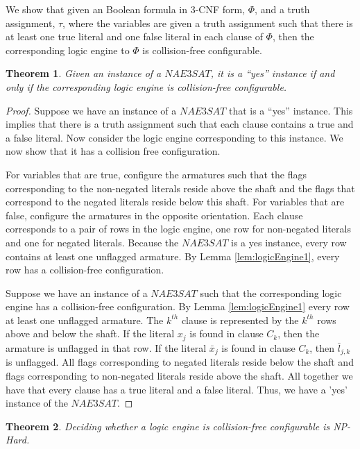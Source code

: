 \documentclass[10pt]{CSUNthesis}
\theoremstyle{plain}%
\newtheorem{thm}{Theorem}
\theoremstyle{definition}
\theoremstyle{remark}
\begin{document}
We show that given an Boolean formula in 3-CNF form, $\Phi$, and a truth assignment, $\tau$, where the variables are given a truth assignment such that there is at least one true literal and one false literal in each clause of $\Phi$, then the corresponding logic engine to $\Phi$ is collision-free configurable.
\begin{thm}\label{thm:LogicEngineV3-1}
 Given an instance of a $NAE3SAT$,  it is a ``yes'' instance if and only if the corresponding logic 
engine is collision-free configurable.
\end{thm}
\begin{proof}
Suppose we have an instance of a $NAE3SAT$ that is a ``yes'' instance. This implies that there is a 
truth assignment such that each clause contains a true and a false literal. Now consider the logic 
engine corresponding to this instance. We now 
show that it has a collision free configuration.

For variables that are true, configure the armatures such that the flags corresponding to the 
non-negated literals reside above the 
shaft and the flags that correspond to the negated literals reside below this shaft.  For variables 
that are false, configure the 
armatures in the opposite orientation.  Each clause corresponds to a pair of rows in 
the logic engine, one row for non-negated literals and one for negated literals.  Because the 
$NAE3SAT$ is a yes instance, every row contains at least one unflagged armature.  
By Lemma \ref{lem:logicEngine1}, every row  has a collision-free configuration.

Suppose we have an instance of a $NAE3SAT$ such that the corresponding logic engine has a 
collision-free configuration. By Lemma \ref{lem:logicEngine1} every row at least one unflagged 
armature.  The $k^{th}$ clause is represented by the $k^{th}$ rows above and below the shaft. If the 
literal $x_j$ is found in clause $C_k$, then the armature is unflagged in that row. If the literal 
$\bar{x}_j$ is found in clause $C_k$, then $\bar{l}_{j,k}$ is unflagged.  All flags 
corresponding to negated literals reside below the shaft and flags corresponding to non-negated 
literals reside above the shaft.  All together we have that every clause has a true literal and a 
false literal.  Thus, we have a 'yes' instance of the $NAE3SAT$.
\end{proof}
\begin{thm}\label{thm:LogicEngineV3-2}
Deciding whether a logic engine is collision-free configurable is NP-Hard.
\end{thm}
\end{document}
